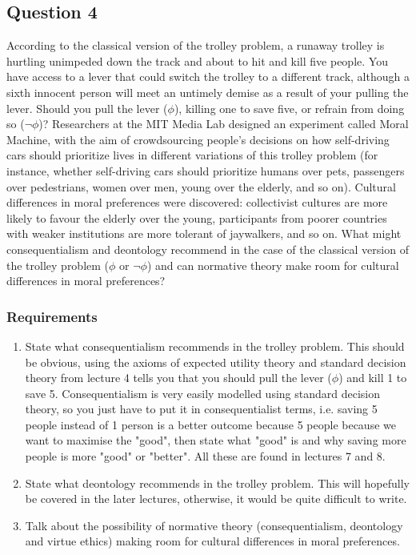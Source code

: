\documentclass[11pt]{article}
\begin{document}
 \newpage
\subsection{Question 4}
\label{sec:org69a7021}
According to the classical version of the trolley problem, a runaway trolley is hurtling unimpeded down the track and about to hit and kill five people. You have access to a lever that could switch the trolley to a different track, although a sixth innocent person will meet an untimely demise as a result of your pulling the lever. Should you pull the lever (\(\phi\)), killing one to save five, or refrain from doing so (\(\neg \phi\))? Researchers at the MIT Media Lab designed an experiment called Moral Machine, with the aim of crowdsourcing people’s decisions on how self-driving cars should prioritize lives in different variations of this trolley problem (for instance, whether self-driving cars should prioritize humans over pets, passengers over pedestrians, women over men, young over the elderly, and so on). Cultural differences in moral preferences were discovered: collectivist cultures are more likely to favour the elderly over the young, participants from poorer countries with weaker institutions are more tolerant of jaywalkers, and so on. What might consequentialism and deontology recommend in the case of the classical version of the trolley problem (\(\phi\) or \(\neg \phi\)) and can normative theory make room for cultural differences in moral preferences?
\subsubsection{Requirements}
\label{sec:orgaf39d77}
\begin{enumerate}
\item State what consequentialism recommends in the trolley problem. This should be obvious, using the axioms of expected utility theory and standard decision theory from lecture 4 tells you that you should pull the lever (\(\phi\)) and kill 1 to save 5. Consequentialism is very easily modelled using standard decision theory, so you just have to put it in consequentialist terms, i.e. saving 5 people instead of 1 person is a better outcome because 5 people because we want to maximise the "good", then state what "good" is and why saving more people is more "good" or "better". All these are found in lectures 7 and 8.
\item State what deontology recommends in the trolley problem. This will hopefully be covered in the later lectures, otherwise, it would be quite difficult to write.
\item Talk about the possibility of normative theory (consequentialism, deontology and virtue ethics) making room for cultural differences in moral preferences.
\end{enumerate}
\end{document}
